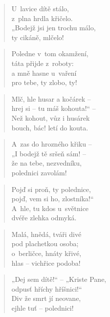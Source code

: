 \begin{verse}
U~lavice dítě stálo, \\
z~plna hrdla křičelo. \\
„Bodejž jsi jen trochu málo, \\
ty cikáně, mlčelo!
\end{verse}

\begin{verse}
Poledne v~tom okamžení, \\
táta přijde z~roboty: \\
a mně hasne u~vaření \\
pro tebe, ty zlobo, ty!
\end{verse}

\begin{verse}
Mlč, hle husar a kočárek -- \\
hrej si -- tu máš kohouta!“ -- \\
Než kohout, vůz i husárek \\
bouch, bác! letí do kouta.
\end{verse}

\begin{verse}
A~zas do hrozného křiku -- \\
„I bodejž tě sršeň sám! -- \\
že na tebe, nezvedníku, \\
polednici zavolám!
\end{verse}

\begin{verse}
Pojď si proň, ty polednice, \\
pojď, vem si ho, zlostníka!“ \\
A~hle, tu kdos u~světnice \\
dvéře zlehka odmyká.
\end{verse}

\begin{verse}
Malá, hnědá, tváři divé \\
pod plachetkou osoba; \\
o~berličce, hnáty křivé, \\
hlas -- vichřice podoba!
\end{verse}

\begin{verse}
„Dej sem dítě!“ -- „Kriste Pane, \\
odpusť hříchy hříšnici!“ \\
Div že smrt jí neovane, \\
ejhle tuť -- polednici!
\end{verse}

